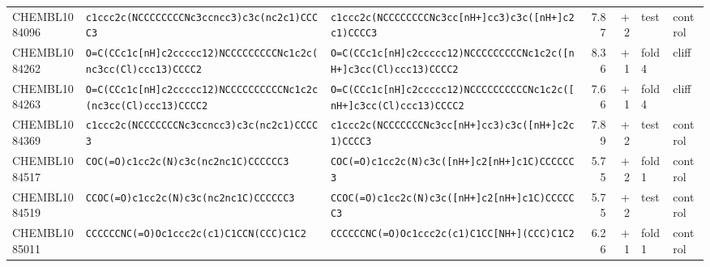 \begin{longtable}{l p{4.4cm} p{4.4cm} r r l l}
CHEMBL1084096 & \texttt{c1ccc2c(\allowbreak{}NCCCCCCCCNc3ccncc3)\allowbreak{}c3c(\allowbreak{}nc2c1)\allowbreak{}CCCC3} & \texttt{c1ccc2c(\allowbreak{}NCCCCCCCCNc3cc[nH+]\allowbreak{}cc3)\allowbreak{}c3c(\allowbreak{}[nH+]\allowbreak{}c2c1)\allowbreak{}CCCC3} & 7.87 & +2 & test & control \\
CHEMBL1084262 & \texttt{O=\allowbreak{}C(\allowbreak{}CCc1c[nH]\allowbreak{}c2ccccc12)\allowbreak{}NCCCCCCCCCNc1c2c(\allowbreak{}nc3cc(\allowbreak{}Cl)\allowbreak{}ccc13)\allowbreak{}CCCC2} & \texttt{O=\allowbreak{}C(\allowbreak{}CCc1c[nH]\allowbreak{}c2ccccc12)\allowbreak{}NCCCCCCCCCNc1c2c(\allowbreak{}[nH+]\allowbreak{}c3cc(\allowbreak{}Cl)\allowbreak{}ccc13)\allowbreak{}CCCC2} & 8.36 & +1 & fold 4 & cliff \\
CHEMBL1084263 & \texttt{O=\allowbreak{}C(\allowbreak{}CCc1c[nH]\allowbreak{}c2ccccc12)\allowbreak{}NCCCCCCCCCCNc1c2c(\allowbreak{}nc3cc(\allowbreak{}Cl)\allowbreak{}ccc13)\allowbreak{}CCCC2} & \texttt{O=\allowbreak{}C(\allowbreak{}CCc1c[nH]\allowbreak{}c2ccccc12)\allowbreak{}NCCCCCCCCCCNc1c2c(\allowbreak{}[nH+]\allowbreak{}c3cc(\allowbreak{}Cl)\allowbreak{}ccc13)\allowbreak{}CCCC2} & 7.66 & +1 & fold 4 & cliff \\
CHEMBL1084369 & \texttt{c1ccc2c(\allowbreak{}NCCCCCCCNc3ccncc3)\allowbreak{}c3c(\allowbreak{}nc2c1)\allowbreak{}CCCC3} & \texttt{c1ccc2c(\allowbreak{}NCCCCCCCNc3cc[nH+]\allowbreak{}cc3)\allowbreak{}c3c(\allowbreak{}[nH+]\allowbreak{}c2c1)\allowbreak{}CCCC3} & 7.89 & +2 & test & control \\
CHEMBL1084517 & \texttt{COC(\allowbreak{}=\allowbreak{}O)\allowbreak{}c1cc2c(\allowbreak{}N)\allowbreak{}c3c(\allowbreak{}nc2nc1C)\allowbreak{}CCCCCC3} & \texttt{COC(\allowbreak{}=\allowbreak{}O)\allowbreak{}c1cc2c(\allowbreak{}N)\allowbreak{}c3c(\allowbreak{}[nH+]\allowbreak{}c2[nH+]\allowbreak{}c1C)\allowbreak{}CCCCCC3} & 5.75 & +2 & fold 1 & control \\
CHEMBL1084519 & \texttt{CCOC(\allowbreak{}=\allowbreak{}O)\allowbreak{}c1cc2c(\allowbreak{}N)\allowbreak{}c3c(\allowbreak{}nc2nc1C)\allowbreak{}CCCCCC3} & \texttt{CCOC(\allowbreak{}=\allowbreak{}O)\allowbreak{}c1cc2c(\allowbreak{}N)\allowbreak{}c3c(\allowbreak{}[nH+]\allowbreak{}c2[nH+]\allowbreak{}c1C)\allowbreak{}CCCCCC3} & 5.75 & +2 & test & control \\
CHEMBL1085011 & \texttt{CCCCCCNC(\allowbreak{}=\allowbreak{}O)\allowbreak{}Oc1ccc2c(\allowbreak{}c1)\allowbreak{}C1CCN(\allowbreak{}CCC)\allowbreak{}C1C2} & \texttt{CCCCCCNC(\allowbreak{}=\allowbreak{}O)\allowbreak{}Oc1ccc2c(\allowbreak{}c1)\allowbreak{}C1CC[NH+]\allowbreak{}(\allowbreak{}CCC)\allowbreak{}C1C2} & 6.26 & +1 & fold 1 & control \\

\end{longtable}
